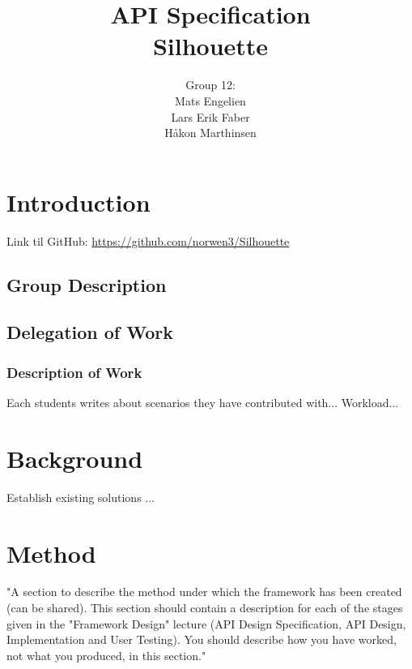 \documentclass[12pt]{article}
\begin{document}
\title{%
    API Specification\\
    \large Silhouette}
\author{%
    Group 12:\\
    Mats Engelien\\
    Lars Erik Faber\\
    Håkon Marthinsen}
\date{}
\maketitle

\newpage

\tableofcontents

\newpage

\section{Introduction}

Link til GitHub: \href{https://github.com/norwen3/Silhouette}{https://github.com/norwen3/Silhouette}

\subsection{Group Description}

    \subsection{Delegation of Work}

    \subsubsection{Description of Work}
    Each students writes about scenarios they have contributed with...
    Workload...

\section{Background}
Establish existing solutions ...

\section{Method}
"A section to describe the method under which the framework has been created (can be shared). This section should contain a description for each of the stages given in the "Framework Design" lecture (API Design Specification, API Design, Implementation and User Testing). 
You should describe how you have worked, not what you produced, in this section."
\end{document}

